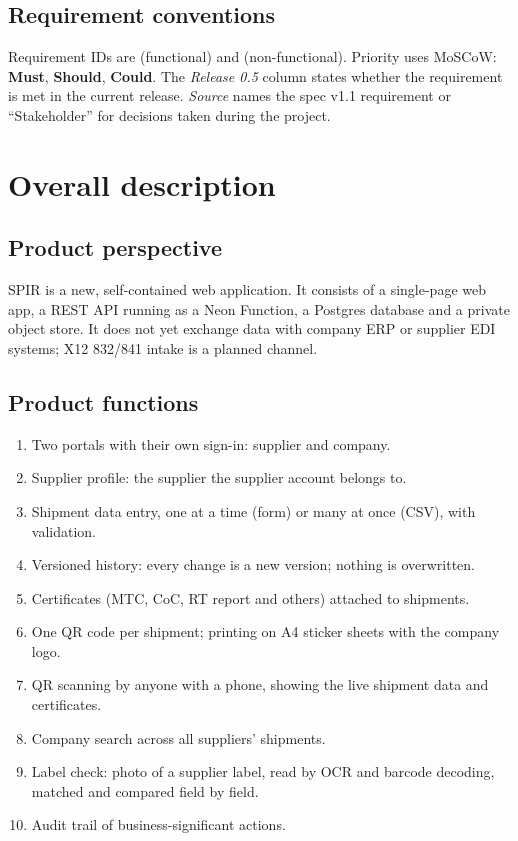 \documentclass[11pt,a4paper]{article}
\begin{document}
\subsection{Requirement conventions}
Requirement IDs are  (functional) and  (non-functional).
Priority uses MoSCoW: \textbf{Must}, \textbf{Should}, \textbf{Could}. The \emph{Release 0.5} column states whether the
requirement is met in the current release. \emph{Source} names the spec v1.1 requirement or ``Stakeholder'' for
decisions taken during the project.

\section{Overall description}
\subsection{Product perspective}
SPIR is a new, self-contained web application. It consists of a single-page web app, a REST API running as a Neon
Function, a Postgres database and a private object store. It does not yet exchange data with company ERP or supplier
EDI systems; X12 832/841 intake is a planned channel.


\subsection{Product functions}
\begin{enumerate}
  \item Two portals with their own sign-in: supplier and company.
  \item Supplier profile: the supplier the supplier account belongs to.
  \item Shipment data entry, one at a time (form) or many at once (CSV), with validation.
  \item Versioned history: every change is a new version; nothing is overwritten.
  \item Certificates (MTC, CoC, RT report and others) attached to shipments.
  \item One QR code per shipment; printing on A4 sticker sheets with the company logo.
  \item QR scanning by anyone with a phone, showing the live shipment data and certificates.
  \item Company search across all suppliers' shipments.
  \item Label check: photo of a supplier label, read by OCR and barcode decoding, matched and compared field by field.
  \item Audit trail of business-significant actions.
\end{enumerate}
\end{document}
